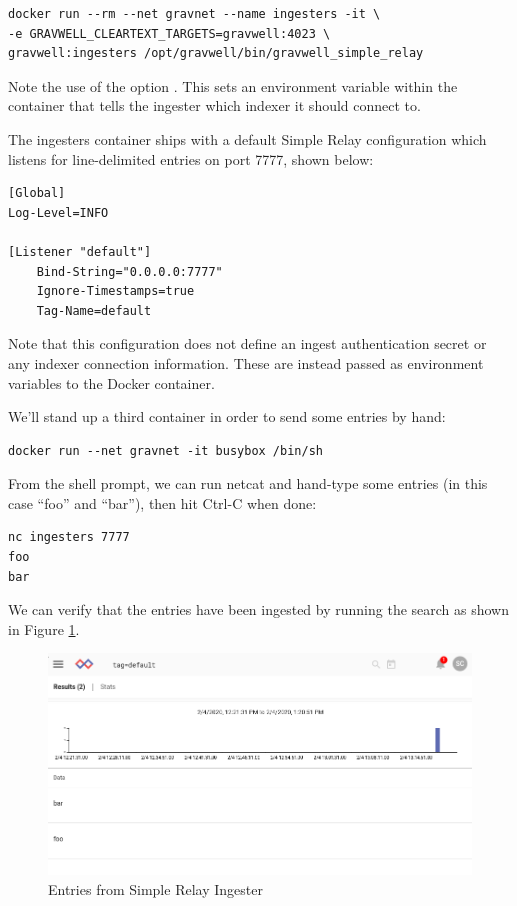 \begin{Verbatim}[breaklines=true]
docker run --rm --net gravnet --name ingesters -it \
-e GRAVWELL_CLEARTEXT_TARGETS=gravwell:4023 \
gravwell:ingesters /opt/gravwell/bin/gravwell_simple_relay
\end{Verbatim}

Note the use of the option .
This sets an environment
variable within the container that tells the ingester which indexer it
should connect to.

The ingesters container ships with a default Simple Relay configuration
which listens for line-delimited entries on port 7777, shown below:

\begin{Verbatim}[breaklines=true]
[Global]
Log-Level=INFO

[Listener "default"]
    Bind-String="0.0.0.0:7777"
    Ignore-Timestamps=true
    Tag-Name=default
\end{Verbatim}

Note that this configuration does not define an ingest authentication
secret or any indexer connection information. These are instead passed
as environment variables to the Docker container.

We'll stand up a third container in order to send some entries by
hand:

\begin{Verbatim}[breaklines=true]
docker run --net gravnet -it busybox /bin/sh
\end{Verbatim}

{From the shell prompt, we can run netcat and hand-type some entries (in
this case ``foo'' and ``bar''), then hit Ctrl-C when done:}

\begin{Verbatim}[breaklines=true]
nc ingesters 7777
foo
bar
\end{Verbatim}

We can verify that the entries have been ingested by running the search
 as shown in Figure \ref{fig:simple-relay-lab}.

\begin{figure}
	\includegraphics{images/igst-syslog-lab.png}
	\caption{Entries from Simple Relay Ingester}
	\label{fig:simple-relay-lab}
\end{figure}


